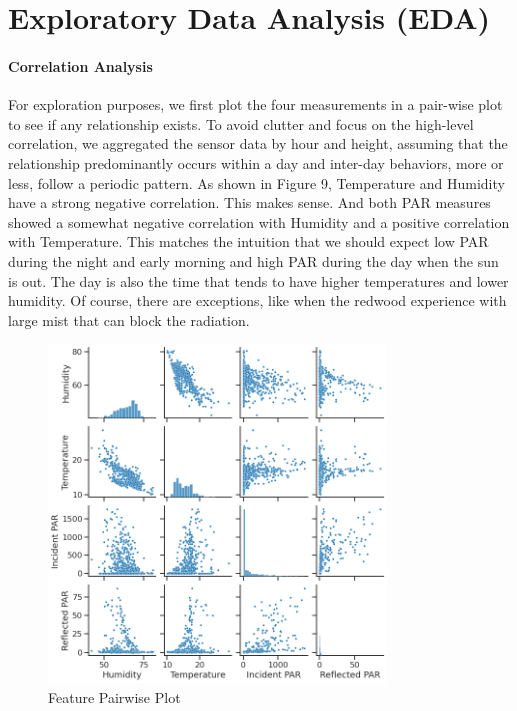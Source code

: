 \documentclass[11pt, letterpaper]{article}
\begin{document}
\section{Exploratory Data Analysis (EDA)}
\paragraph{Correlation Analysis}
For exploration purposes, we first plot the four measurements in a pair-wise plot to see if any relationship exists. To avoid clutter and focus on the high-level correlation, we aggregated the sensor data by hour and height, assuming that the relationship predominantly occurs within a day and inter-day behaviors, more or less, follow a periodic pattern. As shown in Figure 9, Temperature and Humidity have a strong negative correlation. This makes sense. And both PAR measures showed a somewhat negative correlation with Humidity and a positive correlation with Temperature. This matches the intuition that we should expect low PAR during the night and early morning and high PAR during the day when the sun is out. The day is also the time that tends to have higher temperatures and lower humidity. Of course, there are exceptions, like when the redwood experience with large mist that can block the radiation.
\begin{figure}[h!]
\centering
\includegraphics[width=0.8\textwidth]{eda_3.1.png}
\captionsetup{justification=centering}
\caption{Feature Pairwise Plot}
\end{figure}
\end{document}

